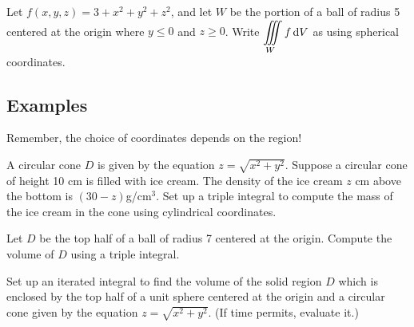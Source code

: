 \begin{ex}
    Let $f(x,y,z)=3+x^2+y^2+z^2$, and let $W$ be the portion of a ball of radius 5 centered at the origin where $y\le0$ and $z\ge0$. Write $\displaystyle\iiint\limits_W f\mathop{}\!\mathrm{d} V$ as using spherical coordinates.
\end{ex}

\pagebreak 

\subsection{Examples}
Remember, the choice of coordinates depends on the region!
\begin{ex}
    A circular cone $D$ is given by the equation $z=\sqrt{x^2+y^2}$. Suppose a circular cone of height 10 cm is filled with ice cream. The density of the ice cream $z$ cm above the bottom is $(30-z)$g/cm$^3$. Set up a triple integral to compute the mass of the ice cream in the cone using cylindrical coordinates.
\end{ex}

\vfill 

\pagebreak 

\begin{ex}
    Let $D$ be the top half of a ball of radius 7 centered at the origin. Compute the volume of $D$ using a triple integral.
\end{ex}

\vfill

\vspace{.5in}

\pagebreak 

\begin{ex}
    Set up an iterated integral to find the volume of the solid region $D$ which is enclosed by the top half of a unit sphere centered at the origin and a circular cone given by the equation $z=\sqrt{x^2+y^2}$. (If time permits, evaluate it.)
\end{ex}

